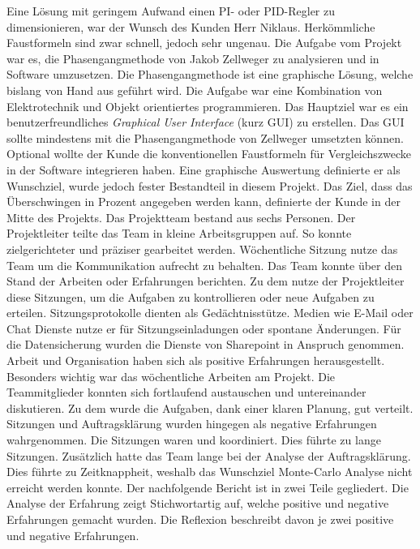 Eine Lösung mit geringem Aufwand einen PI- oder PID-Regler zu dimensionieren, war der Wunsch des Kunden Herr Niklaus. Herkömmliche Faustformeln sind zwar schnell, jedoch sehr ungenau. Die Aufgabe vom Projekt war es, die Phasengangmethode von Jakob Zellweger zu analysieren und in Software umzusetzen. Die Phasengangmethode ist eine graphische Lösung, welche bislang von Hand aus geführt wird. Die Aufgabe war eine Kombination von Elektrotechnik und Objekt orientiertes programmieren. Das Hauptziel war es ein benutzerfreundliches  \textit{Graphical User Interface} (kurz GUI)  zu erstellen. Das GUI sollte mindestens mit die Phasengangmethode von Zellweger umsetzten können. Optional wollte der Kunde die konventionellen Faustformeln für Vergleichszwecke in der Software integrieren haben. Eine graphische Auswertung definierte er als Wunschziel, wurde jedoch fester Bestandteil in diesem Projekt. Das Ziel, dass das Überschwingen in Prozent angegeben werden kann, definierte der Kunde in der Mitte des Projekts. Das Projektteam bestand aus sechs Personen. Der Projektleiter teilte das Team in kleine Arbeitsgruppen auf. So konnte zielgerichteter und präziser gearbeitet werden. Wöchentliche Sitzung nutze das Team um die Kommunikation aufrecht zu behalten. Das Team konnte über den Stand der Arbeiten oder Erfahrungen berichten. Zu dem nutze der Projektleiter diese Sitzungen, um die Aufgaben zu kontrollieren oder neue Aufgaben zu erteilen. Sitzungsprotokolle dienten als Gedächtnisstütze. Medien wie E-Mail oder Chat Dienste nutze er für Sitzungseinladungen oder spontane Änderungen. Für die Datensicherung wurden die Dienste von Sharepoint in Anspruch genommen. 
Arbeit und Organisation haben sich als positive Erfahrungen herausgestellt. Besonders wichtig war das wöchentliche Arbeiten am Projekt. Die Teammitglieder konnten sich fortlaufend austauschen und untereinander diskutieren. Zu dem wurde die Aufgaben, dank einer klaren Planung, gut verteilt. Sitzungen und  Auftragsklärung wurden hingegen als negative Erfahrungen wahrgenommen. Die Sitzungen waren und koordiniert. Dies führte zu lange Sitzungen. Zusätzlich hatte das Team lange bei der Analyse der Auftragsklärung. Dies führte zu Zeitknappheit, weshalb das Wunschziel Monte-Carlo Analyse nicht erreicht werden konnte.
Der nachfolgende Bericht ist in zwei Teile gegliedert. Die Analyse der Erfahrung zeigt Stichwortartig auf, welche positive und negative Erfahrungen gemacht wurden. Die Reflexion beschreibt davon je zwei positive und negative Erfahrungen. 